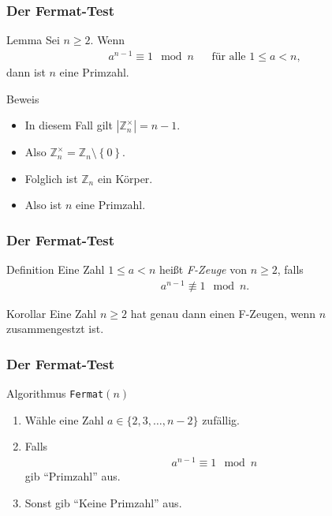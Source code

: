 \documentclass{beamer}
\renewcommand{\emph}[1]{{\textcolor{solarizedRed}{\itshape #1}}}
\newcommand\ZZ{\mathbb Z}
\newcommand\cbc[1]{\left\{{#1}\right\}}
\renewcommand{\ae}{\"a}
\renewcommand{\oe}{\"o}
\newcommand{\ue}{\"u}
\begin{document}
\begin{frame}\frametitle{Der Fermat-Test}
	\begin{block}{Lemma}
		Sei $n\geq2$.
		Wenn 
		\begin{align*}
			a^{n-1}\equiv 1\mod n&&\mbox{f\ue r alle }1\leq a<n,
		\end{align*}
		dann ist $n$ eine Primzahl.
	\end{block}
	\begin{block}{Beweis}
		\begin{itemize}
			\item In diesem Fall gilt $|\ZZ_n^\times|=n-1$.
			\item Also $\ZZ_n^\times=\ZZ_n\setminus\cbc0$.
			\item Folglich ist $\ZZ_n$ ein K\oe rper.
			\item Also ist $n$ eine Primzahl.
		\end{itemize}
	\end{block}
\end{frame}

\begin{frame}\frametitle{Der Fermat-Test}
	\begin{block}{Definition}
		Eine Zahl $1\leq a<n$ hei\ss t \emph{F-Zeuge} von $n\geq2$, falls
		\begin{align*}
			a^{n-1}\not\equiv1\mod n.
		\end{align*}
	\end{block}
	\begin{block}{Korollar}
		Eine Zahl $n\geq2$ hat genau dann einen F-Zeugen, wenn $n$ zusammengestzt ist.
	\end{block}
\end{frame}

\begin{frame}\frametitle{Der Fermat-Test}
	\begin{block}{Algorithmus {\tt Fermat}$(n)$}
		\begin{enumerate}
			\item W\ae hle eine Zahl $a\in\{2,3,\ldots,n-2\}$ zuf\ae llig.
			\item Falls
				\begin{align*}
					a^{n-1}\equiv1\mod n
			\end{align*}
			gib ``Primzahl'' aus.
		\item Sonst gib ``Keine Primzahl'' aus.
		\end{enumerate}
	\end{block}
\end{frame}
\end{document}
